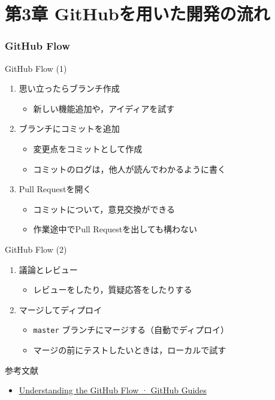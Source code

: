 \documentclass[t, aspectratio=169]{beamer}
\begin{document}
\part{第3章 GitHubを用いた開発の流れ}
\label{sec-3}
\section{GitHub Flow}
\label{sec-3-1}
\begin{frame}[label=sec-3-1-1]{GitHub Flow (1)}
\begin{enumerate}
\item 思い立ったらブランチ作成
\begin{itemize}
\item 新しい機能追加や，アイディアを試す
\end{itemize}
\item ブランチにコミットを追加
\begin{itemize}
\item 変更点をコミットとして作成
\item コミットのログは，他人が読んでわかるように書く
\end{itemize}
\item Pull Requestを開く
\begin{itemize}
\item コミットについて，意見交換ができる
\item 作業途中でPull Requestを出しても構わない
\end{itemize}
\end{enumerate}
\end{frame}
\begin{frame}[fragile,label=sec-3-1-2]{GitHub Flow (2)}
 \begin{enumerate}
\item 議論とレビュー
\begin{itemize}
\item レビューをしたり，質疑応答をしたりする
\end{itemize}
\item マージしてディプロイ
\begin{itemize}
\item \texttt{master} ブランチにマージする（自動でディプロイ）
\item マージの前にテストしたいときは，ローカルで試す
\end{itemize}
\end{enumerate}
参考文献
\begin{itemize}
\item \href{https://guides.github.com/introduction/flow/index.html}{Understanding the GitHub Flow · GitHub Guides}
\end{itemize}
\end{frame}
\end{document}
